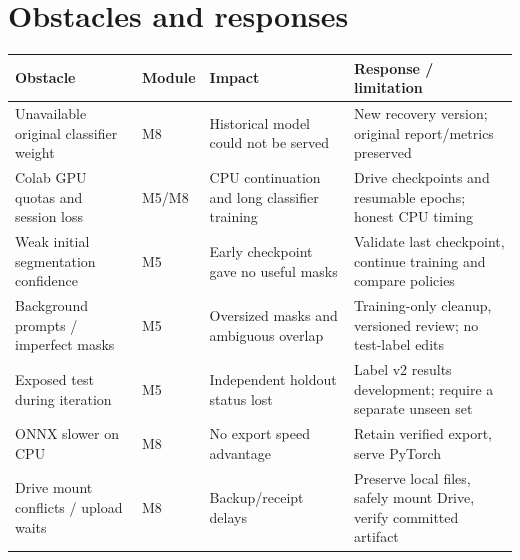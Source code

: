 \documentclass[11pt,a4paper]{article}
\begin{document}
\section{Obstacles and responses}
\par\noindent\begin{tabularx}{\linewidth}{@{}Y l Y Y@{}}\toprule
Obstacle & Module & Impact & Response / limitation\\\midrule
Unavailable original classifier weight & M8 & Historical model could not be served & New recovery version; original report/metrics preserved\\
Colab GPU quotas and session loss & M5/M8 & CPU continuation and long classifier training & Drive checkpoints and resumable epochs; honest CPU timing\\
Weak initial segmentation confidence & M5 & Early checkpoint gave no useful masks & Validate last checkpoint, continue training and compare policies\\
Background prompts / imperfect masks & M5 & Oversized masks and ambiguous overlap & Training-only cleanup, versioned review; no test-label edits\\
Exposed test during iteration & M5 & Independent holdout status lost & Label v2 results development; require a separate unseen set\\
ONNX slower on CPU & M8 & No export speed advantage & Retain verified export, serve PyTorch\\
Drive mount conflicts / upload waits & M8 & Backup/receipt delays & Preserve local files, safely mount Drive, verify committed artifact\\\bottomrule
\end{tabularx}\par
\end{document}
